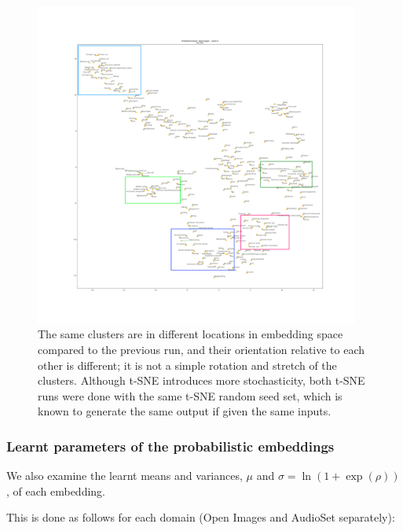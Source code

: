 \begin{figure}[H]
    \centering
    \includegraphics[width=0.95\textwidth]{images/method/probabilistic_independent/top300_tsne_openimages__ProbabilisticGlove_2_clusters.png}
    \caption{
        The same clusters are in different locations in embedding space compared to the previous run, and their orientation relative to each other is different; it is not a simple rotation and stretch of the clusters. Although t-SNE introduces more stochasticity, both t-SNE runs were done with the same t-SNE random seed set, which is known to generate the same output if given the same inputs. 
    }
\end{figure}

\subsubsection{Learnt parameters of the probabilistic embeddings}

We also examine the learnt means and variances, $\mu$ and $\sigma = \ln(1 + \exp(\rho))$, of each embedding. 

This is done as follows for each domain (Open Images and AudioSet separately):

